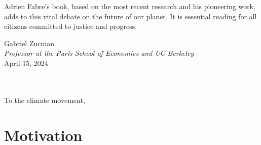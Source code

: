 \documentclass[a5paper,english,openany]{memoir}
\begin{document}
Adrien Fabre's book, based on the most recent research and his pioneering work, adds to this vital debate on the future of our planet. It is essential reading for all citizens committed to justice and progress.

\begin{flushright}
Gabriel Zucman\\
\textit{Professor at the Paris School of Economics and UC Berkeley}\\
April 15, 2024

\clearpage
\quad \\ ~\vspace{2cm} \\
{\raggedleft To the climate movement,}
\end{flushright}
\clearpage

\chapter*{Motivation}{\label{ch:intro}}
\end{document}
